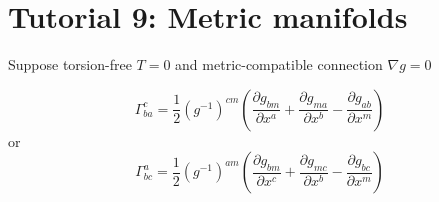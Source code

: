 \section*{Tutorial 9: Metric manifolds}



Suppose torsion-free $T=0$ and metric-compatible connection $\nabla g=0$







\[
\boxed{ \Gamma^c_{ba} = \frac{1}{2} (g^{-1})^{cm} \left( \frac{ \partial g_{bm} }{ \partial x^a} + \frac{ \partial g_{ma}}{ \partial x^b} - \frac{ \partial g_{ab}}{ \partial x^m} \right) }
\]
or 
\[
\Gamma^a_{bc} = \frac{1}{2} (g^{-1})^{am} \left( \frac{ \partial g_{bm}}{\partial x^c} + \frac{ \partial g_{mc}}{ \partial x^b} - \frac{ \partial g_{bc}}{ \partial x^m} \right)
\]


